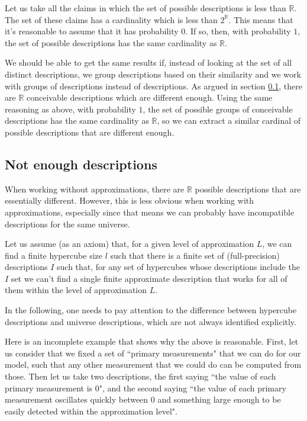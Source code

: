 \documentclass[a4paper
,draft
]{article}
\def\reale{\mathbb{R}}
\newcommand{\ghilimele}[1]{``#1"}
\begin{document}
Let us take all the claims in which the set of possible descriptions
is less than $\reale$.
The set of these claims has a cardinality which is less than $2^\reale$.
This means that it's reasonable to assume that it has probability $0$.
If so, then, with probability $1$, the set of possible descriptions has the same
cardinality as $\reale$.

We should be able to get the same results if, instead of looking at the set
of all distinct descriptions, we group descriptions based on their similarity
and we work with groups of descriptions instead of descriptions.
As argued in section \ref{sec:not-enough-descriptions},
there are $\reale$ conceivable descriptions which are different
enough.
Using the same reasoning
as above, with probability $1$, the set of possible groups of
conceivable descriptions
has the same cardinality as $\reale$, so we can extract a similar cardinal of
possible descriptions that are different enough.

\subsection{Not enough descriptions}
\label{sec:not-enough-descriptions}

When working without approximations, there are $\reale$ possible descriptions
that are essentially different. However, this is less obvious when working with
approximations, especially since that means we can probably have incompatible
descriptions for the same universe.

Let us assume (as an axiom) that, for a given level of approximation $L$, we can
find a finite hypercube size $l$ such that there is a finite set of
(full-precision)
descriptions $I$ such that,
for any set of hypercubes whose descriptions include the $I$ set we can't
find a single finite approximate description that works for all of them
within the level of approximation $L$.

In the following, one needs to pay attention to the difference between
hypercube descriptions and universe descriptions, which are not always
identified explicitly.

Here is an incomplete example that shows why the above is reasonable.
First, let us consider that we fixed a set of
\ghilimele{primary measurements} that we
can do for our model, such that any other measurement that we could do can be
computed from those.
Then let us take two descriptions, the first saying
\ghilimele{the value of each primary measurement is $0$},
and the second saying
\ghilimele{the value of each primary measurement oscillates quickly
  between $0$ and something large enough to be easily detected within
  the approximation level}.
\end{document}
